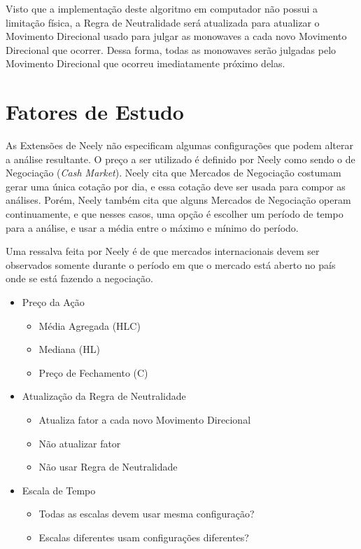 \documentclass[12pt]{article}
\begin{document}
Visto que a implementação deste algoritmo em computador não possui a limitação física,
a Regra de Neutralidade será atualizada para atualizar o Movimento Direcional usado para julgar
as monowaves a cada novo Movimento Direcional que ocorrer. Dessa forma, todas as monowaves
serão julgadas pelo Movimento Direcional que ocorreu imediatamente próximo delas.

\section{Fatores de Estudo}

As Extensões de Neely não especificam algumas configurações que podem alterar a
análise resultante. O preço a ser utilizado é definido por Neely como sendo o de Negociação
(\textit{Cash Market}). Neely cita que Mercados de Negociação costumam gerar uma única cotação
por dia, e essa cotação deve ser usada para compor as análises. Porém, Neely também cita
que alguns Mercados de Negociação operam continuamente, e que nesses casos, uma opção é
escolher um período de tempo para a análise, e usar a média entre o máximo e mínimo do período.

Uma ressalva feita por Neely é de que mercados internacionais devem ser observados somente
durante o período em que o mercado está aberto no país onde se está fazendo a negociação.

\begin{itemize}
	\item Preço da Ação
	\begin{itemize}
		\item Média Agregada (HLC)
		\item Mediana (HL)
		\item Preço de Fechamento (C)
	\end{itemize}
	\item Atualização da Regra de Neutralidade
	\begin{itemize}
		\item Atualiza fator a cada novo Movimento Direcional
		\item Não atualizar fator
		\item Não usar Regra de Neutralidade
	\end{itemize}
	\item Escala de Tempo
	\begin{itemize}
		\item Todas as escalas devem usar mesma configuração?
		\item Escalas diferentes usam configurações diferentes?
	\end{itemize}
\end{itemize}
\end{document}
